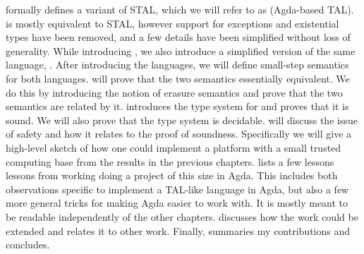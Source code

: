 \textbf{} formally defines a variant of STAL, which we will
refer to as \ATAL (Agda-based TAL). \ATAL is mostly equivalent to STAL, however
support for exceptions and existential types have been removed, and a few
details have been simplified without loss of generality. While introducing
\ATAL, we also introduce a simplified version of the same language,
\ATALe. After introducing the languages, we will define small-step semantics for
both languages. \textbf{} will prove that the two semantics
essentially equivalent. We do this by introducing the notion of erasure
semantics and prove that the two semantics are related by
it. \textbf{} introduces the type system for \ATAL and proves
that it is sound. We will also prove that the type system is
decidable. \textbf{} will discuss the issue of safety and
how it relates to the proof of soundness. Specifically we will give a high-level
sketch of how one could implement a platform with a small trusted computing base
from the results in the previous chapters. \textbf{} lists
a few lessons lessons from working doing a project of this size in Agda. This
includes both observations specific to implement a TAL-like language in Agda,
but also a few more general tricks for making Agda easier to work with. It is
mostly meant to be readable independently of the other
chapters. \textbf{} discusses how the work could be extended
and relates it to other work. Finally, \textbf{} summaries
my contributions and concludes.
